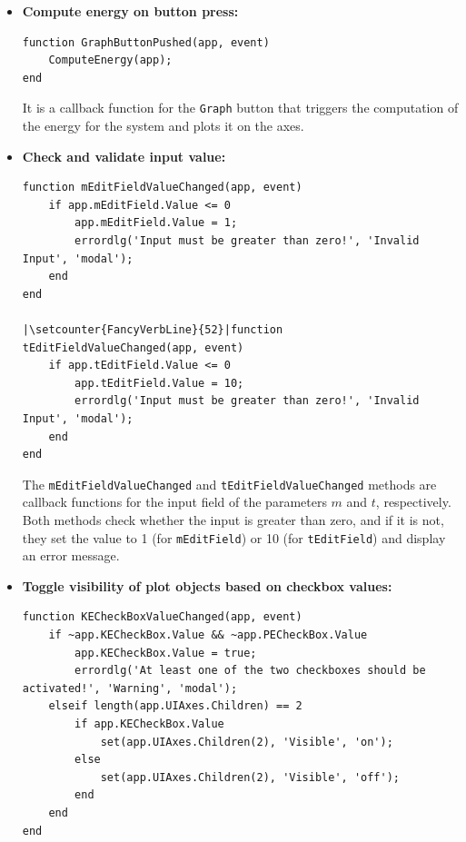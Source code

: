 \documentclass[13pt,a4paper]{report}
\begin{document}
\begin{itemize}[leftmargin=*,itemindent=0.1cm]
    \item \textbf{Compute energy on button press:}
    \begin{verbatim}
function GraphButtonPushed(app, event)
    ComputeEnergy(app);
end
    \end{verbatim}
It is a callback function for the \texttt{Graph} button that triggers the computation of the energy for the system and plots it on the axes.
    
    \item \textbf{Check and validate input value:}
    \begin{verbatim}
function mEditFieldValueChanged(app, event)
    if app.mEditField.Value <= 0
        app.mEditField.Value = 1;
        errordlg('Input must be greater than zero!', 'Invalid Input', 'modal');
    end
end

|\setcounter{FancyVerbLine}{52}|function tEditFieldValueChanged(app, event)
    if app.tEditField.Value <= 0
        app.tEditField.Value = 10;
        errordlg('Input must be greater than zero!', 'Invalid Input', 'modal');
    end
end
    \end{verbatim}
The \texttt{mEditFieldValueChanged} and \texttt{tEditFieldValueChanged} methods are callback functions for the input field of the parameters $m$ and $t$, respectively. Both methods check whether the input is greater than zero, and if it is not, they set the value to 1 (for \texttt{mEditField}) or 10 (for \texttt{tEditField}) and display an error message.

    \newpage
    \item \textbf{Toggle visibility of plot objects based on checkbox values:}
    \begin{verbatim}
function KECheckBoxValueChanged(app, event)
    if ~app.KECheckBox.Value && ~app.PECheckBox.Value
        app.KECheckBox.Value = true;
        errordlg('At least one of the two checkboxes should be activated!', 'Warning', 'modal');
    elseif length(app.UIAxes.Children) == 2
        if app.KECheckBox.Value
            set(app.UIAxes.Children(2), 'Visible', 'on');
        else
            set(app.UIAxes.Children(2), 'Visible', 'off');
        end
    end
end


\end{verbatim}
\end{itemize}
\end{document}
